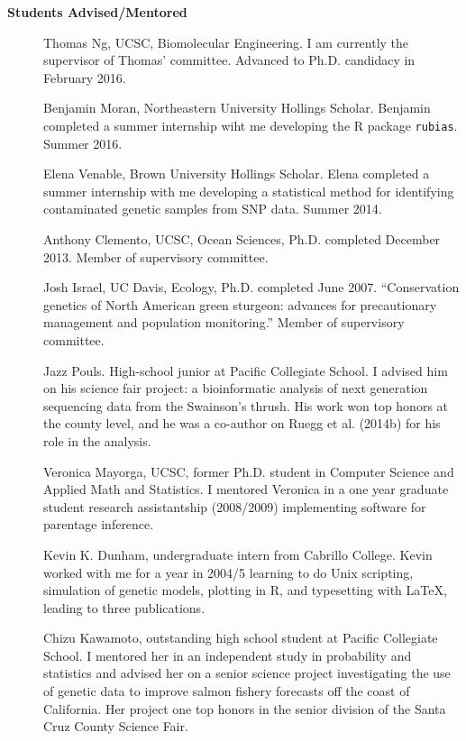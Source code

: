 \documentclass[11pt]{article}
\newlength{\postskip}
\begin{document}
{\bf Students Advised/Mentored}
\begin{description}
\item[] Thomas Ng, UCSC, Biomolecular Engineering.  I am currently the supervisor of Thomas' committee.  Advanced to Ph.D. candidacy in February 2016.
\item[] Benjamin Moran, Northeastern University Hollings Scholar.  Benjamin completed a summer internship wiht
me developing the R package {\tt rubias}. Summer 2016.
\item[] Elena Venable, Brown University Hollings Scholar.  Elena completed a summer internship with me developing 
a statistical method for identifying contaminated genetic samples from SNP data. Summer 2014.
\item[] Anthony Clemento, UCSC, Ocean Sciences, Ph.D. completed December 2013.  Member of supervisory committee.
\item[] Josh Israel, UC Davis, Ecology,  Ph.D. completed June 2007. ``Conservation genetics of North American green sturgeon: advances for precautionary management and population monitoring.'' Member of supervisory committee.
\item[] Jazz Pouls.  High-school junior at Pacific Collegiate School.  I advised him on his science fair project:
a bioinformatic analysis of next generation sequencing data from the Swainson's thrush.  His work won top honors
at the county level, and he was a co-author on Ruegg et al. (2014b) for his role in the analysis.
\item[] Veronica Mayorga, UCSC,  former Ph.D. student in Computer Science and Applied Math and Statistics. I mentored Veronica in a one year graduate student research assistantship (2008/2009) implementing software for parentage inference.
\item[] Kevin K. Dunham,  undergraduate intern from Cabrillo College.  Kevin worked with me for a year in 2004/5 learning to do Unix scripting, simulation of genetic models, plotting in R, and typesetting with \LaTeX{}, leading to three publications. 
\item[] Chizu Kawamoto, outstanding high school student at Pacific Collegiate School.  I mentored her in an independent study in probability and statistics and advised her on a senior science project investigating the use of genetic data to improve salmon fishery forecasts off the coast of California.  Her project one top honors in the senior division of the Santa Cruz County Science Fair.

\end{description}
\vspace*{\postskip}
\end{document}

